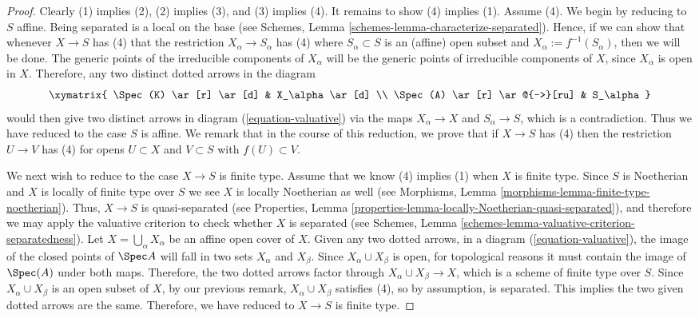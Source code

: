 \begin{proof}
Clearly (1) implies (2), (2) implies (3), and (3) implies (4).  It
remains to show (4) implies (1). Assume (4).
We begin by reducing to $S$ affine.  Being separated is a local
on the base (see
Schemes, Lemma \ref{schemes-lemma-characterize-separated}).
Hence, if we can show that whenever
$X \to S$ has (4) that the restriction $X_\alpha \to S_\alpha$ has (4)
where $S_\alpha \subset S$ is an (affine) open subset and $X_\alpha :=
f^{-1}(S_\alpha)$, then we will be done.  The
generic points of the irreducible components of $X_\alpha$ will be the
generic points of irreducible components of $X$, since $X_\alpha$ is
open in $X$.  Therefore, any two distinct dotted arrows in the diagram
\begin{equation}
\label{equation-valuative-alpha}
\xymatrix{
\Spec(K) \ar[r] \ar[d] & X_\alpha \ar[d] \\
\Spec(A) \ar[r] \ar@{-->}[ru] & S_\alpha
}
\end{equation}
would then give two distinct arrows in diagram
(\ref{equation-valuative}) via the maps $X_\alpha \to X$ and
$S_\alpha \to S$, which is a contradiction.  Thus we have reduced
to the case $S$ is affine.  We remark that in the course of this
reduction, we prove that if $X \to S$ has (4) then the restriction $U
\to V$ has (4) for opens $U \subset X$ and $V \subset S$ with
$f(U) \subset V$.

\medskip\noindent
We next wish to reduce to the case $X \to S$ is finite type.  Assume
that we know (4) implies (1) when $X$ is finite type. Since
$S$ is Noetherian and $X$ is locally of finite type over $S$
we see $X$ is locally Noetherian as well (see Morphisms,
Lemma \ref{morphisms-lemma-finite-type-noetherian}).
Thus, $X \to S$ is quasi-separated (see
Properties, Lemma \ref{properties-lemma-locally-Noetherian-quasi-separated}),
and therefore we may apply the valuative criterion to check whether $X$
is separated (see
Schemes, Lemma \ref{schemes-lemma-valuative-criterion-separatedness}).
Let $X = \bigcup_\alpha X_\alpha$ be an affine open
cover of $X$. Given any two dotted arrows, in a diagram
(\ref{equation-valuative}), the image of the closed points of
$\Spec A$ will
fall in two sets $X_\alpha$ and $X_\beta$.  Since $X_\alpha \cup
X_\beta$ is open, for topological reasons it must contain the image of
$\Spec(A)$ under both maps. Therefore, the two dotted arrows factor
through $X_\alpha \cup X_\beta \to X$, which is a scheme of finite type over
$S$. Since $X_\alpha \cup X_\beta$ is an open subset of $X$, by our
previous remark, $X_\alpha \cup X_\beta$ satisfies (4), so by
assumption, is separated.  This implies the two given dotted
arrows are the same. Therefore, we have reduced to $X \to S$ is finite type.


\end{proof}
